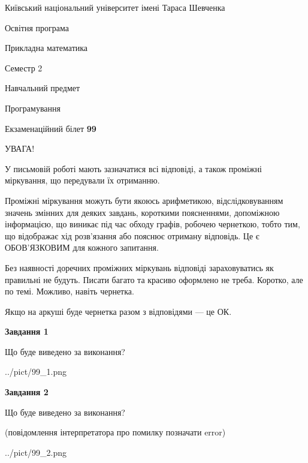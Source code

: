 \documentclass[12pt, ukrainian]{article}
\begin{document}
{{\begin {small}\par
{ \center  Київський національний університет імені Тараса Шевченка \par}
{\parbox {5 cm}{Освітня програма \hfill}{\parbox {7 cm}{Прикладна математика\hfill}}\parbox {6 cm}{\hfill Семестр 2}}\par
{\parbox {5 cm} {Навчальний предмет \hfill}\parbox {7 cm}{Програмування \hfill}\parbox {6cm}{\hfill}\par}\vspace{-7pt} \end{small}}{\center Екзаменаційний білет \No \textbf
{ 99 }\par}}
{
\begin {large}
УВАГА!

У письмовій роботі мають зазначатися всі відповіді, а також проміжні міркування, що передували їх отриманню.

Проміжні міркування можуть бути якоюсь арифметикою, відслідковуванням зна\-чень змінних для деяких завдань,
короткими поясненнями, допоміжною інформацією, що виникає під час обходу графів, робочею чернеткою,
тобто тим, що відображає хід розв’язання або пояснює отриману відповідь.
Це є ОБОВ’ЯЗКОВИМ для кожного запитання.

Без наявності доречних проміжних міркувань відповіді зараховуватись як правиль\-ні не будуть.
Писати багато та красиво оформлено не треба. Коротко, але по темі. Можли\-во, навіть чернетка.

Якщо на аркуші буде чернетка разом з відповідями --- це ОК.

\newpage

{\begin {center}\textbf{Завдання 1}\end {center}}\par
Що буде виведено за виконання?\par
\begin{center}
	{../pict/99_1.png}
\end{center}
\newpage

{\begin {center}\textbf{Завдання 2}\end {center}}\par
Що буде виведено за виконання?\par
 (повідомлення інтерпретатора про помилку позначати error)\par
\begin{center}
	{../pict/99_2.png}
\end{center}
\newpage


\end{large}}
\end{document}
